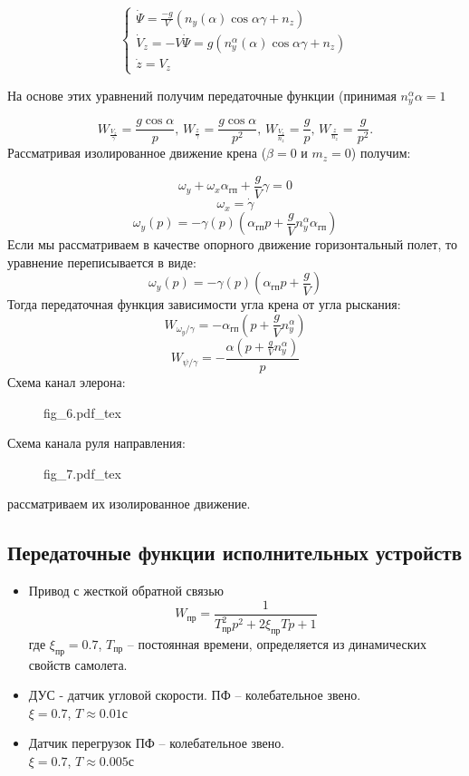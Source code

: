 \documentclass{article}
\begin{document}
\begin{equation}
	\begin{cases}
		\dot{\Psi} = \frac{-g}{V}(n_y(\alpha)\cos{\alpha}\gamma + n_z)
		\\
		\dot{V}_z = -V \dot{\Psi} = g(n_y^{\alpha}(\alpha) \cos{\alpha\gamma} +
		n_z) \\
		\dot{z} = V_z
	\end{cases}
\end{equation}

На основе этих уравнений получим передаточные функции (принимая $n_y^{\alpha}
	\alpha =1 $

\[
	W_{\frac{V_z}{\gamma}} = \frac{g\cos{\alpha}}{p}, \, W_{\frac{z}{\gamma}} =
	\frac{g\cos{\alpha}}{p^2}, \, W_{\frac{V_z}{n_z}}= \frac{g}{p}, \,
	W_{\frac{z}{n_z}} = \frac{g}{p^2}.
\]
Рассматривая изолированное движение крена ($\beta = 0$ и $m_z = 0$) получим:

\[
	\omega_y + \omega_x \alpha_{\text{гп}} + \frac{g}{V}\gamma = 0
\]
\[
	\omega_x = \dot{\gamma}
\]
\[
	\omega_y(p) = -\gamma(p)(\alpha_\text{гп}p + \frac{g}{V}n_y^\alpha
	\alpha_\text{гп})
\]
Если мы рассматриваем в качестве опорного движение горизонтальный полет, то
уравнение переписывается в виде:
\[
	\omega_y(p) = -\gamma(p)(\alpha_\text{гп}p + \frac{g}{V})
\]
Тогда передаточная функция зависимости угла крена от угла рыскания:
\[
	W_{\omega_y/\gamma} = -\alpha_\text{гп} (p+\frac{g}{V}n_y^\alpha)
\]
\[
	W_{\psi/\gamma} = -\frac{\alpha(p + \frac{g}{V} n_y^\alpha)} {p}
\]
Схема канал элерона:
\begin{figure}[H]
	\centering
	{fig_6.pdf_tex}
\end{figure}
Схема канала руля направления:
\begin{figure}[H]
	\centering
	{fig_7.pdf_tex}
\end{figure}
рассматриваем их изолированное движение.

\subsection{Передаточные функции исполнительных устройств}
\begin{itemize}
	\item Привод с жесткой обратной связью
	      \[
		      W_\text{пр} = \frac{1}{T_\text{пр}^2p^2 + 2 \xi_\text{пр} Tp + 1}
	      \]
	      где $\xi_\text{пр} = 0.7$, $T_\text{пр}$ -- постоянная времени,
	      определяется из динамических свойств самолета.

	\item ДУС - датчик угловой скорости.
	      ПФ -- колебательное звено.\\
	      $\xi = 0.7$, $T \approx 0.01 \text{с}$

	\item Датчик перегрузок
	      ПФ -- колебательное звено.\\
	      $\xi = 0.7$, $T \approx 0.005 \text{с}$
\end{itemize}
\end{document}

